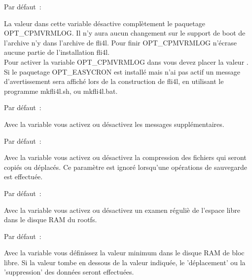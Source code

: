 \begin{description}


  Par défaut~: 

  La valeur  dans cette variable désactive complètement le paquetage
  OPT\_CPMVRMLOG. Il n'y aura aucun changement sur le support de boot de
  l'archive  n'y dans l'archive  de fli4l. Pour
  finir OPT\_CPMVRMLOG n'écrase aucune partie de l'installation fli4l.\\
  Pour activer la variable OPT\_CPMVRMLOG dans  vous devez
  placer la valeur . Si le paquetage OPT\_EASYCRON est installé mais
  n'ai pas actif un message d'avertissement sera affiché lors de la construction
  de fli4l, en utilisant le programme mkfli4l.sh, ou mkfli4l.bat.\\


  Par défaut~: 

  Avec la variable  vous activez ou désactivez les
  messages supplémentaires.\\


  Par défaut~: 

  Avec la variable  vous activez ou désactivez la
  compression des fichiers qui seront copiés ou déplacés. Ce paramètre est
  ignoré lorsqu'une opérations de sauvegarde est effectuée.\\


  Par défaut~: 

  Avec la variable  vous activez ou désactivez un
  examen réguliè de l'espace libre dans le disque RAM du rootfs.\\


  Par défaut~: 

  Avec la variable  vous définissez la valeur
  minimum dans le disque RAM de bloc libre. Si la valeur tombe en dessous de
  la valeur indiquée, le 'déplacement' ou la 'suppression' des données seront
  effectuées.\\


\end{description}

